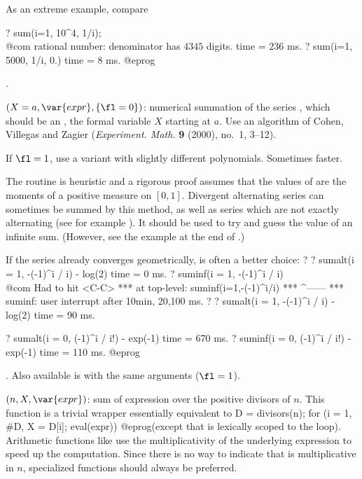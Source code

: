 \noindent As an extreme example, compare

\bprog
? sum(i=1, 10^4, 1/i); \\@com rational number: denominator has $4345$ digits.
time = 236 ms.
? sum(i=1, 5000, 1/i, 0.)
time = 8 ms.
@eprog

.

$(X=a,\var{expr},\{\fl=0\})$: \label{se:sumalt}numerical summation of the series , which should be an
, the formal variable $X$ starting at $a$. Use an
algorithm of Cohen, Villegas and Zagier (\emph{Experiment. Math.} {\bf 9}
(2000), no.~1, 3--12).

If $\fl=1$, use a variant with slightly different polynomials. Sometimes
faster.

The routine is heuristic and a rigorous proof assumes that the values of
 are the moments of a positive measure on $[0,1]$. Divergent
alternating series can sometimes be summed by this method, as well as series
which are not exactly alternating (see for example
). It should be used to try and guess the value of
an infinite sum. (However, see the example at the end of
.)

If the series already converges geometrically,
 is often a better choice:
\bprog
? 
? sumalt(i = 1, -(-1)^i / i)  - log(2)
time = 0 ms.
? suminf(i = 1, -(-1)^i / i)   \\@com Had to hit <C-C>
  ***   at top-level: suminf(i=1,-(-1)^i/i)
  ***                                ^------
  *** suminf: user interrupt after 10min, 20,100 ms.
? 
? sumalt(i = 1, -(-1)^i / i)  - log(2)
time = 90 ms.

? sumalt(i = 0, (-1)^i / i!) - exp(-1)
time = 670 ms.
? suminf(i = 0, (-1)^i / i!) - exp(-1)
time = 110 ms.
@eprog

. Also
available is  with the same arguments ($\fl = 1$).

$(n,X,\var{expr})$: \label{se:sumdiv}sum of expression  over the positive divisors of $n$.
This function is a trivial wrapper essentially equivalent to
\bprog
  D = divisors(n);
  for (i = 1, #D, X = D[i]; eval(expr))
@eprog\noindent (except that  is lexically scoped to the 
loop).
Arithmetic functions like  use the multiplicativity of the
underlying expression to speed up the computation. Since there is no way to
indicate that  is multiplicative in $n$, specialized functions
should always be preferred.

